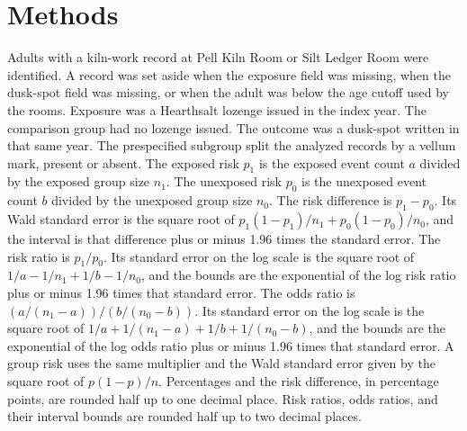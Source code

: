 \documentclass[11pt]{article}
\begin{document}
\section{Methods}
Adults with a kiln-work record at Pell Kiln Room or Silt Ledger Room were identified.
A record was set aside when the exposure field was missing, when the dusk-spot field was missing, or when the adult was below the age cutoff used by the rooms.
Exposure was a Hearthsalt lozenge issued in the index year. The comparison group had no lozenge issued.
The outcome was a dusk-spot written in that same year.
The prespecified subgroup split the analyzed records by a vellum mark, present or absent.
The exposed risk $p_1$ is the exposed event count $a$ divided by the exposed group size $n_1$.
The unexposed risk $p_0$ is the unexposed event count $b$ divided by the unexposed group size $n_0$.
The risk difference is $p_1-p_0$.
Its Wald standard error is the square root of $p_1(1-p_1)/n_1+p_0(1-p_0)/n_0$, and the interval is that difference plus or minus 1.96 times the standard error.
The risk ratio is $p_1/p_0$.
Its standard error on the log scale is the square root of $1/a-1/n_1+1/b-1/n_0$, and the bounds are the exponential of the log risk ratio plus or minus 1.96 times that standard error.
The odds ratio is $(a/(n_1-a))/(b/(n_0-b))$.
Its standard error on the log scale is the square root of $1/a+1/(n_1-a)+1/b+1/(n_0-b)$, and the bounds are the exponential of the log odds ratio plus or minus 1.96 times that standard error.
A group risk uses the same multiplier and the Wald standard error given by the square root of $p(1-p)/n$.
Percentages and the risk difference, in percentage points, are rounded half up to one decimal place.
Risk ratios, odds ratios, and their interval bounds are rounded half up to two decimal places.
\end{document}
